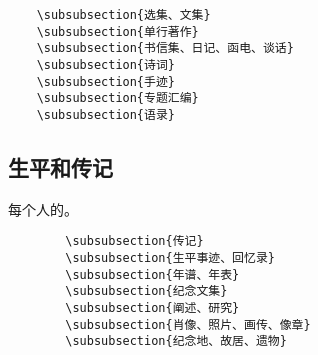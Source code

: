 \documentclass[UTF8]{../RepresentationUniverse}
\begin{document}
\begin{lstlisting}
    \subsubsection{选集、文集}
    \subsubsection{单行著作}
    \subsubsection{书信集、日记、函电、谈话}
    \subsubsection{诗词}
    \subsubsection{手迹}
    \subsubsection{专题汇编}
    \subsubsection{语录}
\end{lstlisting}


    

\subsection{生平和传记}
    每个人的。
    \begin{lstlisting}
        \subsubsection{传记}
        \subsubsection{生平事迹、回忆录}
        \subsubsection{年谱、年表}
        \subsubsection{纪念文集}
        \subsubsection{阐述、研究}
        \subsubsection{肖像、照片、画传、像章}
        \subsubsection{纪念地、故居、遗物}
    \end{lstlisting}
\end{document}
